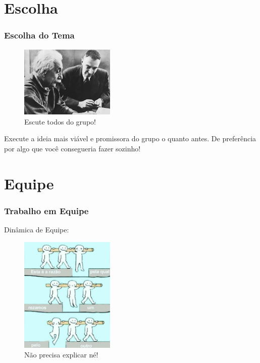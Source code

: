 \documentclass{beamer}
\begin{document}
\section{Escolha}
\begin{frame}
  \frametitle{Escolha do Tema}
  \begin{block}{}
      \begin{figure}
      \centering
      \includegraphics[width=0.4\textwidth]{Einstein_oppenheimer.jpg}
      \captionsetup{labelformat=simple, labelsep=period}
      \caption{Escute todos do grupo!}
    \end{figure}
    Execute a ideia mais viável e promissora do grupo o quanto antes. De preferência por algo que você consegueria fazer sozinho!
  \end{block}
\end{frame}

\section{Equipe}
\begin{frame}
  \frametitle{Trabalho em Equipe}
  \begin{block}{Dinâmica de Equipe:}
        \begin{figure}
      \centering
      \includegraphics[width=0.4\textwidth]{juntos.jpg}
      \captionsetup{labelformat=simple, labelsep=period}
      \caption{Não precisa explicar né!}
    \end{figure}
  \end{block}
\end{frame}
\end{document}
